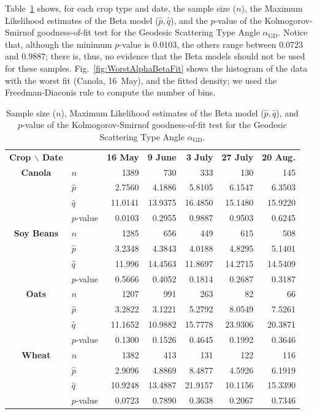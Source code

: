 \documentclass[journal]{IEEEtran}
\begin{document}
Table~\ref{tab:params_alpha} shows, for each crop type and date, 
the sample size ($n$), 
the Maximum Likelihood estimates of the Beta model ($\widehat p,\widehat q$), and the $p$-value of the Kolmogorov-Smirnof goodness-of-fit test for the Geodesic Scattering Type Angle $\alpha_{\text{GD}}$.
Notice that, although the minimum $p$-value is $0.0103$, the others range between $0.0723$ and $0.9887$; there is, thus, no evidence that the Beta models should not be used for these samples.
Fig.~\ref{fig:WorstAlphaBetaFit} shows the histogram of the data with the worst fit (Canola, 16~May), and the fitted density; we used the Freedman-Diaconis rule to compute the number of bins.

\begin{table}[hbt]
	\centering
	\caption{Sample size ($n$), Maximum Likelihood estimates of the Beta model ($\widehat p,\widehat q$), and $p$-value of the Kolmogorov-Smirnof goodness-of-fit test for the Geodesic Scattering Type Angle $\alpha_{\text{GD}}$.}
	\label{tab:params_alpha}
	\setlength{\tabcolsep}{4pt}
\begin{tabular}{clrrrrr}
	\toprule
\textbf{Crop $\backslash$ Date} & & \textbf{16 May} & \textbf{9 June} & \textbf{3 July} & \textbf{27 July} & \textbf{20 Aug.}\\ \cmidrule(lr){1-2} \cmidrule(lr){3-3} \cmidrule(lr){4-4} \cmidrule(lr){5-5} \cmidrule(lr){6-6} \cmidrule(lr){7-7}
\textbf{Canola} 	& $n$ 			& 1389 		& 730 		& 333 		& 130 		& 145\\
 		& $\widehat{p}$ & 2.7560 	& 4.1886 	& 5.8105 	& 6.1547 	& 6.3503\\
		& $\widehat{q}$ & 11.0141 	& 13.9375 	& 16.4850 	& 15.1480 	& 15.9220\\ 
 		& $p$-value 	& 0.0103 	& 0.2955 	& 0.9887 	& 0.9503 	& 0.6245\\		
		\midrule
\textbf{Soy Beans}	& $n$ 			& 1285 		& 656 		& 449 		& 615 		& 508\\
 			& $\widehat{p}$ & 3.2348 	& 4.3843 	& 4.0188 	& 4.8295 	& 5.1401\\
			& $\widehat{q}$ & 11.996 	& 14.4563 	& 11.8697 	& 14.2715 	& 14.5409\\ 
 			& $p$-value 	& 0.5666 	& 0.4052 	& 0.1814 	& 0.2687 	& 0.3187\\			
			\midrule
\textbf{Oats}	& $n$ 			& 1207 		& 991 		& 263 		& 82 		& 66\\
		& $\widehat{p}$ & 3.2822  	& 3.1221 	& 5.2792 	& 8.0549 	& 7.5261\\
		& $\widehat{q}$ & 11.1652 	& 10.9882 	& 15.7778 	& 23.9306 	& 20.3871\\ 
		& $p$-value 	& 0.1300 	& 0.1526 	& 0.4645 	& 0.1992 	& 0.3646\\
		\midrule
\textbf{Wheat} 	& $n$ 			& 1382 		& 413 		& 131 		& 122 		& 116\\
		& $\widehat{p}$ & 2.9096  	& 4.8869 	& 8.4877 	& 4.5926 	& 6.1919\\
		& $\widehat{q}$ & 10.9248 	& 13.4887 	& 21.9157 	& 10.1156 	& 15.3390\\
		& $p$-value 	& 0.0723 	& 0.7890 	& 0.3638 	& 0.2067 	& 0.7346\\	
	\bottomrule
\end{tabular}
\end{table}
\end{document}
